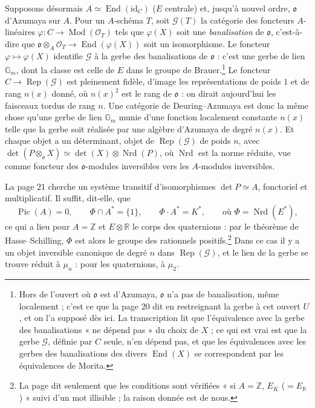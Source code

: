 \documentclass[11pt,a4paper]{article}
\begin{document}
Supposons désormais $A \simeq \operatorname{End}(\mathrm{id}_{C})$ ($E$
centrale) et, jusqu'à nouvel ordre, $\mathfrak{o}$ d'Azumaya sur $A$. Pour un
$A$-schéma $T$, soit $\mathcal{G}(T)$ la catégorie des foncteurs $A$-linéaires
$\varphi \colon C \to \operatorname{Mod}(\mathcal{O}_{T})$ tels que $\varphi(X)$
soit une \emph{banalisation} de $\mathfrak{o}$, c'est-à-dire que $\mathfrak{o}
\otimes_{A} \mathcal{O}_{T} \to \operatorname{End}(\varphi(X))$ soit un
isomorphisme. Le foncteur $\varphi \mapsto \varphi(X)$ identifie $\mathcal{G}$ à
la gerbe des banalisations de $\mathfrak{o}$ : c'est une gerbe de lien
$\mathbb{G}_{m}$, dont la classe est celle de $E$ dans le groupe de
Brauer.\footnote{Hors de l'ouvert où $\mathfrak{o}$ est d'Azumaya, $\mathfrak{o}$
n'a pas de banalisation, même localement ; c'est ce que la page 20 dit en
restreignant la gerbe à cet ouvert $U$, et on l'a supposé dès ici. La
transcription lit que l'équivalence avec la gerbe des banalisations « ne dépend
pas » du choix de $X$ ; ce qui est vrai est que la gerbe $\mathcal{G}$, définie
par $C$ seule, n'en dépend pas, et que les équivalences avec les gerbes des
banalisations des divers $\operatorname{End}(X)$ se correspondent par les
équivalences de Morita.} Le foncteur $C \to \operatorname{Rep}(\mathcal{G})$
est pleinement fidèle, d'image les représentations de poids $1$ et de rang
$n(x)$ donné, où $n(x)^{2}$ est le rang de $\mathfrak{o}$ : on dirait
aujourd'hui les faisceaux tordus de rang $n$. Une catégorie de Deuring--Azumaya
est donc la même chose qu'une gerbe de lien $\mathbb{G}_{m}$ munie d'une
fonction localement constante $n(x)$ telle que la gerbe soit réalisée par une
algèbre d'Azumaya de degré $n(x)$. Et chaque objet a un déterminant, objet de
$\operatorname{Rep}(\mathcal{G})$ de poids $n$, avec
$\det(P \otimes_{\mathfrak{o}} X) \simeq \det(X) \otimes
\operatorname{Nrd}(P)$, où $\operatorname{Nrd}$ est la norme réduite, vue comme
foncteur des $\mathfrak{o}$-modules inversibles vers les $A$-modules
inversibles.

La page 21 cherche un système transitif d'isomorphismes $\det P \simeq A$,
fonctoriel et multiplicatif. Il suffit, dit-elle, que
\[
  \operatorname{Pic}(A) = 0, \qquad \Phi \cap A^{*} = \{1\}, \qquad
  \Phi \cdot A^{*} = K^{*}, \qquad \text{où } \Phi =
  \operatorname{Nrd}(E^{*}) ,
\]
ce qui a lieu pour $A = \mathbb{Z}$ et $E \otimes \mathbb{R}$ le corps des
quaternions : par le théorème de Hasse--Schilling, $\Phi$ est alors le groupe
des rationnels positifs.\footnote{La page dit seulement que les conditions sont
vérifiées « si $A = \mathbb{Z}$, $E_{K}$ ($= E_{\mathbb{R}}$) » suivi d'un mot
illisible ; la raison donnée est de nous.} Dans ce cas il y a un objet
inversible canonique de degré $n$ dans $\operatorname{Rep}(\mathcal{G})$, et le
lien de la gerbe se trouve réduit à $\mu_{n}$ : pour les quaternions, à
$\mu_{2}$.
\end{document}
